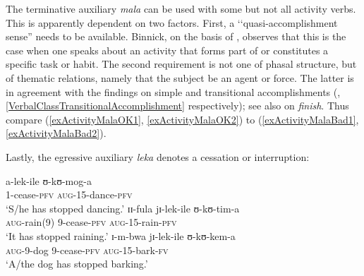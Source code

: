 \label{QuasiAccomplishment} The terminative auxiliary \textit{mala} can be used with some but not all activity verbs. This is apparently dependent on two factors. First, a \lq\lq quasi-accomplishment sense'' \citep[176]{BinnickR1991} needs to be available. Binnick, on the basis of \citet[61]{DowtyD1979}, observes that this is the case when one speaks about an activity that forms part of or constitutes a specific task or habit. The second requirement is not one of phasal structure, but of thematic relations, namely that the subject be an agent or force. The latter is in agreement with the findings on simple and transitional accomplishments (, \ref{VerbalClassTransitionalAccomplishment} respectively); see also \citet[135]{FreedA1979} on  \textit{finish}. Thus compare (\ref{exActivityMalaOK1}, \ref{exActivityMalaOK2}) to (\ref{exActivityMalaBad1}, \ref{exActivityMalaBad2}).
\begin{exe}
\ex\begin{xlist}
\end{xlist}
\end{exe}

Lastly, the egressive auxiliary \textit{leka} denotes a cessation or interruption:
\begin{exe}
\ex
\begin{xlist}
\ex \gll a-lek-ile ʊ-kʊ-mog-a\\
1-cease-\textsc{pfv} \textsc{aug}-15-dance-\textsc{pfv}\\
\glt \lq S/he has stopped dancing.'
\ex \gll ɪɪ-fula jɪ-lek-ile ʊ-kʊ-tim-a\\
\textsc{aug}-rain(9) 9-cease-\textsc{pfv} \textsc{aug}-15-rain-\textsc{pfv}\\
\glt \lq It has stopped raining.'
\ex \gll ɪ-m-bwa jɪ-lek-ile ʊ-kʊ-kem-a\\
\textsc{aug}-9-dog 9-cease-\textsc{pfv} \textsc{aug}-15-bark-\textsc{fv}\\
\glt \lq A/the dog has stopped barking.'
\end{xlist}
\end{exe}

